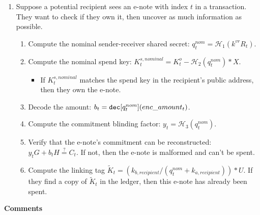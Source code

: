 \begin{enumerate}
    \item Suppose a potential recipient sees an e-note with index $t$ in a transaction. They want to check if they own it, then uncover as much information as possible.
    \begin{enumerate}
        \item Compute the nominal sender-receiver shared secret: $q^{nom}_t = \mathcal{H}_1(k^{vr} R_t)$.
        \item Compute the nominal spend key: $K^{s,nominal}_t = K^o_t - \mathcal{H}_2(q^{nom}_t)*X$.
        \begin{itemize}
            \item If $K^{s,nominal}_t$ matches the spend key in the recipient's public address, then they own the e-note.
        \end{itemize}
        \item Decode the amount: $b_t = \textrm{\tt dec}[q^{nom}_t](enc\_amount_t)$.
        \item Compute the commitment blinding factor: $y_t = \mathcal{H}_3(q^{nom}_t)$.
        \item Verify that the e-note's commitment can be reconstructed: $y_t G + b_t H \stackrel{?}{=} C_t$. If not, then the e-note is malformed and can't be spent.
        \item Compute the linking tag $\tilde{K}_t = (k_{b,recipient}/(q^{nom}_t + k_{a,recipient}))*U$. If they find a copy of $\tilde{K}_t$ in the ledger, then this e-note has already been spent.
    \end{enumerate}
\end{enumerate}

\textbf{Comments}

